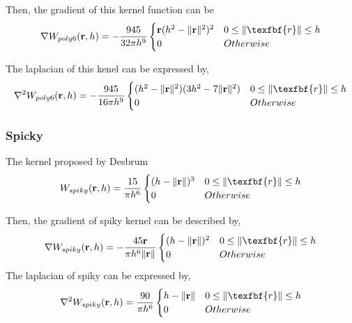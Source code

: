     Then, the gradient of this kernel function can be
    \begin{equation}
        \nabla W_{poly6}(\textbf{r}, h) = - \frac{945}{32\pi h^9}
            \begin{cases}
                \textbf{r}(h^2 - \|\textbf{r}\|^2)^2 & 0\le\|\texfbf{r}\|\le h \\
                0 & Otherwise \\
            \end{cases}
    \end{equation}

    The laplacian of this kenel can be expressed by, 
    \begin{equation}
        \nabla^2 W_{poly6}(\textbf{r}, h) = - \frac{945}{16\pi h^9}
            \begin{cases}
                (h^2 - \|\textbf{r}\|^2)(3h^2-7\|\textbf{r}\|^2) & 0\le\|\texfbf{r}\|\le h \\
                0 & Otherwise \\
            \end{cases}
    \end{equation}

    \subsubsection{Spicky}

    The kernel proposed by Desbrum\cite{desbrun1996smoothed}
    \begin{equation}
        W_{spiky}(\textbf{r}, h) = \frac{15}{\pi h^6}
            \begin{cases}
                (h - \|\textbf{r}\|)^3 & 0\le\|\texfbf{r}\|\le h \\
                0 & Otherwise \\
            \end{cases}
    \end{equation}

    Then, the gradient of spiky kernel can be described by,
    \begin{equation}
        \nabla W_{spiky}(\textbf{r}, h) = -\frac{45 \textbf{r}}{\pi h^6 \|\textbf{r}\|}
            \begin{cases}
                (h - \|\textbf{r}\|)^2 & 0\le\|\texfbf{r}\|\le h \\
                0 & Otherwise \\
            \end{cases}
    \end{equation}
     The laplacian of spiky can be expressed by,
     \begin{equation}
        \nabla^2 W_{spiky}(\textbf{r}, h) = \frac{90}{\pi h^6}
            \begin{cases}
                h - \|\textbf{r}\| & 0\le\|\texfbf{r}\|\le h \\
                0 & Otherwise \\
            \end{cases}
    \end{equation}

